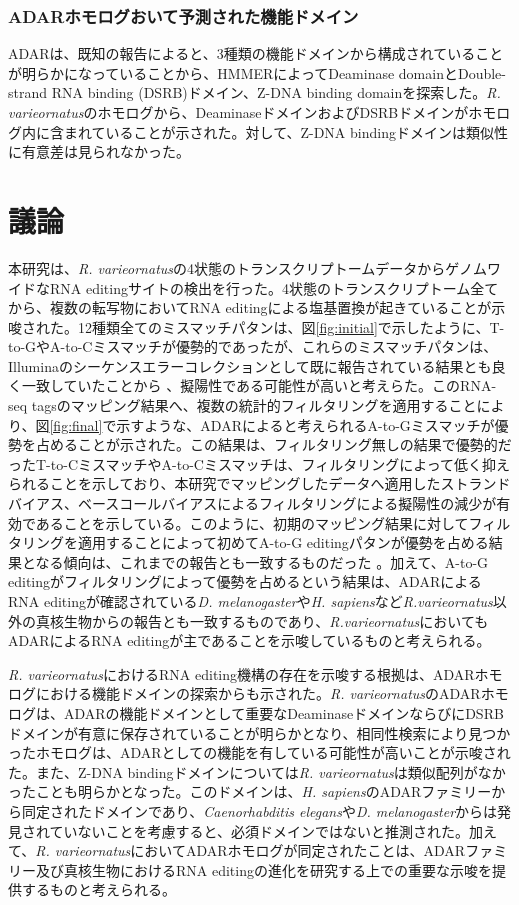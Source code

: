 \subsubsection{ADARホモログおいて予測された機能ドメイン}
ADARは、既知の報告によると、3種類の機能ドメインから構成されていることが明らかになっていることから、HMMERによってDeaminase domainとDouble-strand RNA binding (DSRB)ドメイン、Z-DNA binding domainを探索した。{\it R. varieornatus}のホモログから、DeaminaseドメインおよびDSRBドメインがホモログ内に含まれていることが示された。対して、Z-DNA bindingドメインは類似性に有意差は見られなかった。

\section{議論}
本研究は、{\it R. varieornatus}の4状態のトランスクリプトームデータからゲノムワイドなRNA editingサイトの検出を行った。4状態のトランスクリプトーム全てから、複数の転写物においてRNA editingによる塩基置換が起きていることが示唆された。12種類全てのミスマッチパタンは、図\ref{fig:initial}で示したように、T-to-GやA-to-Cミスマッチが優勢的であったが、これらのミスマッチパタンは、Illuminaのシーケンスエラーコレクションとして既に報告されている結果とも良く一致していたことから \citep{pmid21576222, pmid22099972}、擬陽性である可能性が高いと考えらた。このRNA-seq tagsのマッピング結果へ、複数の統計的フィルタリングを適用することにより、図\ref{fig:final}で示すような、ADARによると考えられるA-to-Gミスマッチが優勢を占めることが示された。この結果は、フィルタリング無しの結果で優勢的だったT-to-CミスマッチやA-to-Cミスマッチは、フィルタリングによって低く抑えられることを示しており、本研究でマッピングしたデータへ適用したストランドバイアス、ベースコールバイアスによるフィルタリングによる擬陽性の減少が有効であることを示している。このように、初期のマッピング結果に対してフィルタリングを適用することによって初めてA-to-G editingパタンが優勢を占める結果となる傾向は、これまでの報告とも一致するものだった \citep{pmid22499667}。加えて、A-to-G editingがフィルタリングによって優勢を占めるという結果は、ADARによるRNA editingが確認されている{\it D. melanogaster}や{\it H. sapiens}など{\it R.varieornatus}以外の真核生物からの報告とも一致するものであり、{\it R.varieornatus}においてもADARによるRNA editingが主であることを示唆しているものと考えられる。
\par
{\it R. varieornatus}におけるRNA editing機構の存在を示唆する根拠は、ADARホモログにおける機能ドメインの探索からも示された。{\it R. varieornatus}のADARホモログは、ADARの機能ドメインとして重要なDeaminaseドメインならびにDSRBドメインが有意に保存されていることが明らかとなり、相同性検索により見つかったホモログは、ADARとしての機能を有している可能性が高いことが示唆された。また、Z-DNA bindingドメインについては{\it R. varieornatus}は類似配列がなかったことも明らかとなった。このドメインは、{\it H. sapiens}のADARファミリーから同定されたドメインであり、{\it Caenorhabditis elegans}や{\it D. melanogaster}からは発見されていないことを考慮すると、必須ドメインではないと推測された。加えて、{\it R. varieornatus}においてADARホモログが同定されたことは、ADARファミリー及び真核生物におけるRNA editingの進化を研究する上での重要な示唆を提供するものと考えられる。
